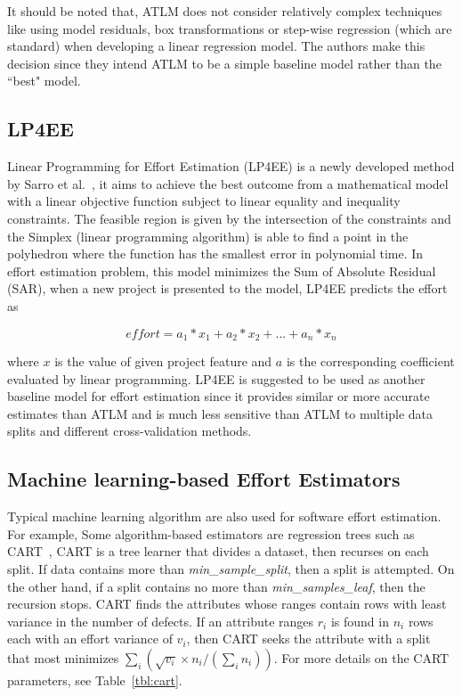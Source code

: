 \documentclass[sigconf,review,anonymous]{acmart}
\begin{document}
It should be noted that, ATLM does not consider relatively complex techniques like using model residuals,  box transformations or step-wise regression (which are standard) when developing a linear regression model. The authors make this decision since they intend ATLM to be a simple baseline model rather than the ``best" model.


\subsection{LP4EE}
\label{sec:lp4ee}
Linear Programming for Effort Estimation (LP4EE) is a newly developed method by Sarro et al.~\cite{SarroTOSEM2018}, it aims to achieve the best outcome from a mathematical
model with a linear objective function subject to linear equality and inequality
constraints. The feasible region is given by the intersection of the constraints and the
Simplex (linear programming algorithm) is able to find a point in the polyhedron where
the function has the smallest error in polynomial time. In effort estimation problem, this model minimizes the Sum of Absolute Residual (SAR), when a new project is presented to the model, LP4EE predicts the effort as

\[
\mathit{effort} = a_1*x_1 + a_2*x_2 + ... + a_n*x_n
\]

where $x$ is the value of given project feature and $a$ is the corresponding coefficient evaluated by linear programming.
LP4EE is suggested to be used as another baseline model for effort estimation since it provides
similar or more accurate estimates than ATLM and is much less sensitive than ATLM
to multiple data splits and different cross-validation methods.

\subsection{Machine learning-based Effort Estimators}
\label{sec:algo}


\newcommand{\centered}[1]{\begin{tabular}{l} #1 \end{tabular}}



Typical machine learning algorithm are also used for software effort estimation. For example, Some algorithm-based estimators are regression trees such as CART~\cite{brieman84}, 
CART is a  tree learner that divides a dataset, then recurses
on each split.
If data contains more than {\em min\_sample\_split}, then a split is attempted.
On the other hand, if a split contains no more than {\em min\_samples\_leaf}, then the recursion stops. 
CART finds the attributes whose ranges contain rows with least variance in the number
of defects. If an  attribute ranges $r_i$ is found in 
$n_i$ rows each with an effort  variance of $v_i$, then CART seeks the  attribute with a split that most
minimizes $\sum_i \left(\sqrt{v_i}\times n_i/(\sum_i n_i)\right)$.
For more details on the CART parameters, see Table~\ref{tbl:cart}.
\end{document}
